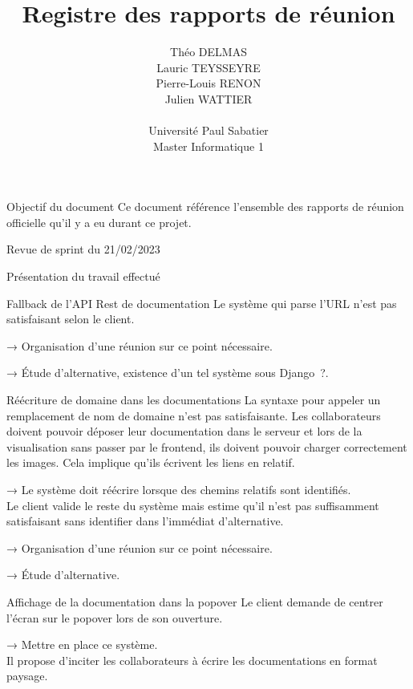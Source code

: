 \documentclass[]{article}
\title{Registre des rapports de réunion}
\author{
    Théo DELMAS\\
    Lauric TEYSSEYRE\\
    Pierre-Louis RENON\\
    Julien WATTIER\\
    \\
    Université Paul Sabatier\\
    Master Informatique 1\\
   }
\begin{document}
\maketitle
\newpage
\tableofcontents
\newpage

\begin{section}{Objectif du document}
 Ce document référence l'ensemble des rapports de réunion officielle qu'il y a eu durant ce projet.
\end{section}

{
\setlength{\parindent}{0pt} %
\begin{section}{Revue de sprint du 21/02/2023}
 \begin{subsection}{Présentation du travail effectué}
     \begin{subsubsection}{Fallback de l’API Rest de documentation}
         Le système qui parse l'URL n’est pas satisfaisant selon le client.

         → Organisation d’une réunion sur ce point nécessaire.

         → Étude d’alternative, existence d’un tel système sous Django ?.
     \end{subsubsection}

     \begin{subsubsection}{Réécriture de domaine dans les documentations}
         La syntaxe pour appeler un remplacement de nom de domaine n’est pas satisfaisante. Les collaborateurs doivent pouvoir déposer leur documentation dans le serveur et lors de la visualisation sans passer par le frontend, ils doivent pouvoir charger correctement les images. Cela implique qu’ils écrivent les liens en relatif.

         → Le système doit réécrire lorsque des chemins relatifs sont identifiés.
         \\[5mm]
         Le client valide le reste du système mais estime qu’il n’est pas suffisamment satisfaisant sans identifier dans l’immédiat d’alternative.

         → Organisation d’une réunion sur ce point nécessaire.

         → Étude d’alternative.
     \end{subsubsection}

     \begin{subsubsection}{Affichage de la documentation dans la popover}
         Le client demande de centrer l’écran sur le popover lors de son ouverture.

         → Mettre en place ce système.
         \\[5mm]
         Il propose d’inciter les collaborateurs à écrire les documentations en format paysage.


\end{subsubsection}
\end{subsection}
\end{section}}
\end{document}
